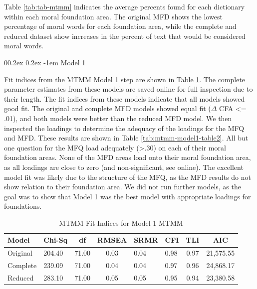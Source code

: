 \documentclass[
  man,floatsintext]{apa6}
\makeatletter
\let\oldparagraph\paragraph
\renewcommand{\paragraph}{
    \@ifstar
      \xxxParagraphStar
      \xxxParagraphNoStar
  }
\newcommand{\xxxParagraphStar}[1]{\oldparagraph*{#1}\mbox{}}
\newcommand{\xxxParagraphNoStar}[1]{\oldparagraph{#1}\mbox{}}
\renewcommand{\paragraph}{\@startsection{paragraph}{4}{\parindent}%
  {0\baselineskip \@plus 0.2ex \@minus 0.2ex}%
  {-1em}%
  {\normalfont\normalsize\bfseries\itshape\typesectitle}}
\makeatother
\begin{document}
Table \ref{tab:tab-mtmm} indicates the average percents found for each dictionary within each moral foundation area. The original MFD shows the lowest percentage of moral words for each foundation area, while the complete and reduced dataset show increases in the percent of text that would be considered moral words.

\paragraph{Model 1}\label{model-1}

Fit indices from the MTMM Model 1 step are shown in Table \ref{tab:mtmm-model1-table}. The complete parameter estimates from these models are saved online for full inspection due to their length. The fit indices from these models indicate that all models showed good fit. The original and complete MFD models showed equal fit (\(\Delta\) CFA \textless= .01), and both models were better than the reduced MFD model. We then inspected the loadings to determine the adequacy of the loadings for the MFQ and MFD. These results are shown in Table \ref{tab:mtmm-model1-table2}. All but one question for the MFQ load adequately (\textgreater.30) on each of their moral foundation areas. None of the MFD areas load onto their moral foundation area, as all loadings are close to zero (and non-significant, see online). The excellent model fit was likely due to the structure of the MFQ, as the MFD results do not show relation to their foundation area. We did not run further models, as the goal was to show that Model 1 was the best model with appropriate loadings for foundations.

\begin{table}[h]

\begin{center}
\begin{threeparttable}

\caption{\label{tab:mtmm-model1-table}MTMM Fit Indices for Model 1 MTMM}

\footnotesize{

\begin{tabular}{llccllcc}
\toprule
Model & Chi-Sq & df & RMSEA & SRMR & CFI & TLI & AIC\\
\midrule
Original & 204.40 & 71.00 & 0.03 & 0.04 & 0.98 & 0.97 & 21,575.55\\
Complete & 239.09 & 71.00 & 0.04 & 0.04 & 0.97 & 0.96 & 24,868.17\\
Reduced & 283.10 & 71.00 & 0.05 & 0.05 & 0.95 & 0.94 & 23,380.58\\
\bottomrule
\end{tabular}

}

\end{threeparttable}
\end{center}

\end{table}
\end{document}
